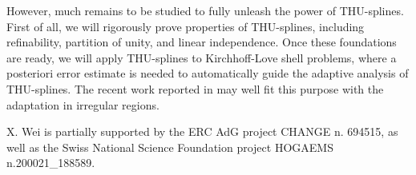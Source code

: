 \documentclass[graybox]{svmult}
\begin{document}
However, much remains to be studied to fully unleash the power of THU-splines. First of all, we will rigorously prove properties of THU-splines, including refinability, partition of unity, and linear independence. Once these foundations are ready, we will apply THU-splines to Kirchhoff-Love shell problems, where a posteriori error estimate is needed to automatically guide the adaptive analysis of THU-splines. The recent work reported in \cite{ref:coradello20} may well fit this purpose with the adaptation in irregular regions.

%
\begin{acknowledgement}
X. Wei is partially supported by the ERC AdG project CHANGE n. 694515, as well as the Swiss National Science Foundation project HOGAEMS n.200021\_188589.
\end{acknowledgement}



\end{document}
